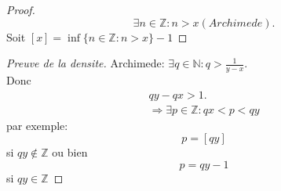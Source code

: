 \documentclass[../main.tex]{subfiles}
\begin{document}
\begin{proof}
\[ 
	\exists n \in \mathbb{Z}: n>x ( Archimede).
\]
Soit $ [ x] = \inf \{ n \in \mathbb{Z}: n>x\} -1$
\end{proof}
\begin{proof}[Preuve de la densite]
Archimede: $\exists q \in \mathbb{N}: q > \frac{1}{y-x}$.\\
Donc
\begin{align*}
qy -qx > 1.\\
\Rightarrow  \exists p \in \mathbb{Z} : qx < p < qy
\end{align*}
par exemple:
\[ 
p = [ qy]
\]
si $qy \notin \mathbb{Z}$
ou bien
\[ 
p = qy -1
\]
si $qy \in \mathbb{Z}$
\end{proof}
\end{document}
